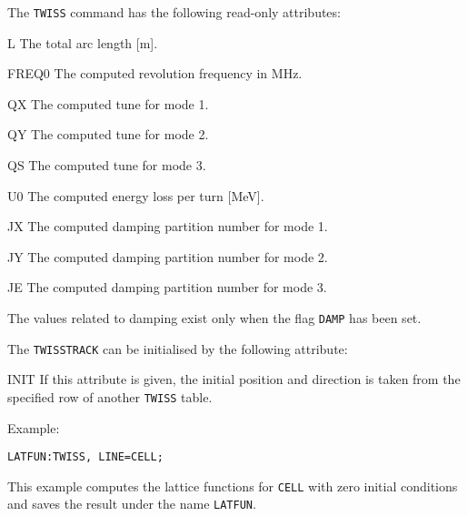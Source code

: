 The \texttt{TWISS} command has the following read-only attributes:
\begin{kdescription}
\item[L]
  The total arc length [m].
\item[FREQ0]
  The computed revolution frequency in MHz.
\item[QX]
  The computed tune for mode 1.
\item[QY]
  The computed tune for mode 2.
\item[QS]
  The computed tune for mode 3.
\item[U0]
  The computed energy loss per turn [MeV].
\item[JX]
  The computed damping partition number for mode 1.
\item[JY]
  The computed damping partition number for mode 2.
\item[JE]
  The computed damping partition number for mode 3.
\end{kdescription}
The values related to damping exist only when the flag \texttt{DAMP}
has been set.

The \texttt{TWISSTRACK} can be initialised by the following attribute:
\begin{kdescription}
\item[INIT]
  If this attribute is given, the initial position and direction is taken
  from the specified row of another \texttt{TWISS} table.
\end{kdescription}

Example:
\begin{verbatim}
LATFUN:TWISS, LINE=CELL;
\end{verbatim}
This example computes the lattice functions for \texttt{CELL} with
zero initial conditions and saves the result under the name
\texttt{LATFUN}.

